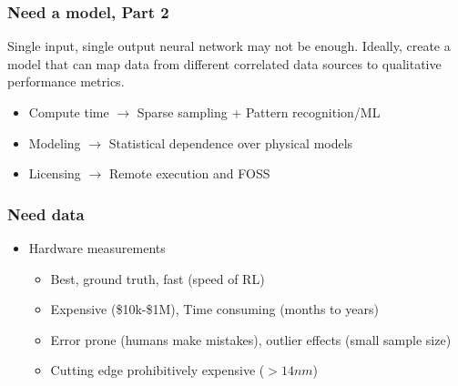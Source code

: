 \documentclass[aspectratio=169]{beamer}
\begin{document}
\begin{frame}
    \frametitle{Need a model, Part 2}
    Single input, single output neural network may not be enough. Ideally, create a model that can map data from different correlated data sources to qualitative performance metrics.
    \begin{itemize}
        \item Compute time $\rightarrow$ Sparse sampling + Pattern recognition/ML
        \item Modeling $\rightarrow$ Statistical dependence over physical models
        \item Licensing $\rightarrow$ Remote execution and FOSS
    \end{itemize}
\end{frame}

\begin{frame}
    \frametitle{Need data}
    \begin{itemize}
        \item Hardware measurements
        \begin{itemize}
            \item Best, ground truth, fast (speed of RL)
            \item Expensive (\$10k-\$1M), Time consuming (months to years)
            \item Error prone (humans make mistakes), outlier effects (small sample size)
            \item Cutting edge prohibitively expensive ($>14nm$)
        \end{itemize}
    \end{itemize}
\end{frame}
\end{document}
